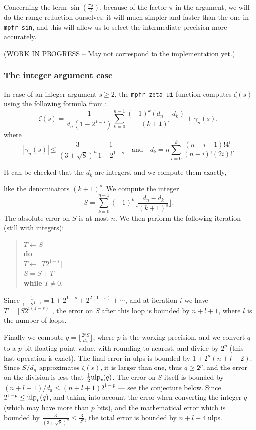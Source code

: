 \documentclass[12pt]{amsart}
\def\q{\hspace*{5mm}}
\def\ulp{{\rm ulp}}
\DeclareMathOperator{\error}{error}
\begin{document}
Concerning the term $\sin\left(\frac{\pi s}{2}\right)$, because of the
factor $\pi$ in the argument, we will do the range reduction ourselves:
it will much simpler and faster than the one in \texttt{mpfr\_sin}, and
this will allow us to select the intermediate precision more accurately.

(WORK IN PROGRESS -- May not correspond to the implementation yet.)

\subsubsection{The integer argument case}
In case of an integer argument $s \geq 2$,
the \texttt{mpfr\_zeta\_ui} function computes
$\zeta(s)$ using the following formula from \cite{Borwein95}:
\[ \zeta(s) = \frac{1}{d_n (1-2^{1-s})} \sum_{k=0}^{n-1} \frac{(-1)^k
  (d_n - d_k)}{(k+1)^s} + \gamma_n(s), \]
where
\[ |\gamma_n(s)| \leq \frac{3}{(3+\sqrt{8})^n} \frac{1}{1-2^{1-s}}
\quad \mbox{and} \quad
   d_k = n \sum_{i=0}^k \frac{(n+i-1)! 4^i}{(n-i)! (2i)!}. \]

It can be checked that the $d_k$ are integers, and we compute them exactly,

like the denominators $(k+1)^s$.
We compute the integer
\[ S =
\sum_{k=0}^{n-1} (-1)^k \lfloor \frac{d_n - d_k}{(k+1)^s}
\rfloor. \]
The absolute error on $S$ is at most $n$. We then perform the following
iteration (still with integers):
\begin{quote}
$T \leftarrow S$ \\
\textbf{do} \\
\q $T \leftarrow \lfloor T 2^{1-s} \rfloor$ \\
\q $S = S + T$ \\
\textbf{while} $T \neq 0$.
\end{quote}
Since $\frac{1}{1-2^{1-s}} = 1 + 2^{1-s} + 2^{2(1-s)} + \cdots$, and
at iteration $i$ we have $T = \lfloor S 2^{i(1-s)} \rfloor$,
the error on $S$ after this loop is bounded by $n+l+1$,
where $l$ is the number of loops.

Finally we compute $q = \lfloor \frac{2^p S}{d_n} \rfloor$,
where $p$ is the working precision,
and we convert $q$ to a $p$-bit floating-point value,
with rounding to nearest, and divide by $2^p$ (this last operation is
exact).
The final error in ulps is bounded by $1 + 2^{\mu} (n+l+2)$.
Since $S/d_n$ approximates $\zeta(s)$, it is larger than one, thus
$q \geq 2^p$, and the error on the division is less that
$\frac{1}{2}\ulp_p(q)$. The error on $S$ itself is bounded by $(n+l+1)/d_n
\leq (n+l+1) 2^{1-p}$ --- see the conjecture below.
Since $2^{1-p} \leq \ulp_p(q)$, and taking into account the error when
converting the integer $q$ (which may have more than $p$ bits),
and the mathematical error which is bounded by $\frac{3}{(3+\sqrt{8})^n}
\leq \frac{3}{2^p}$, the total error is bounded by $n+l+4$ ulps.
\end{document}
